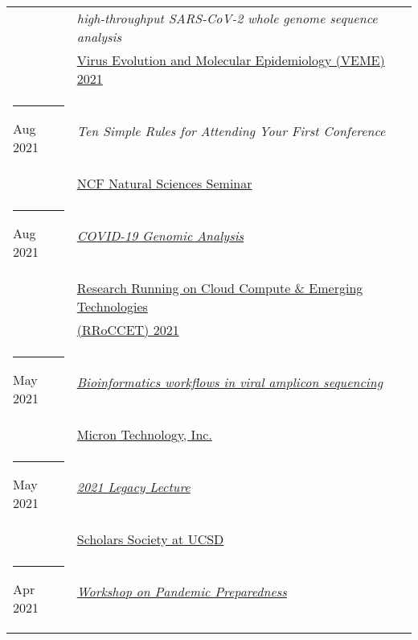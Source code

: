 \documentclass[margin,line]{res}
\begin{document}
\begin{resume}
\begin{longtable}{@{}p{0.7in}p{4in}}
\hspace*{-4mm} & \hspace{4mm} \textit{high-throughput SARS-CoV-2 whole genome sequence analysis}\\*
\hspace*{-4mm} & \hspace{4mm} \href{https://rega.kuleuven.be/cev/veme-workshop/2021}{Virus Evolution and Molecular Epidemiology (VEME) 2021}\\
\hspace*{-4mm} \rule{-1mm}{5mm} Aug 2021 & \textit{Ten Simple Rules for Attending Your First Conference}\\*
\hspace*{-4mm} & \hspace{4mm} \href{https://www.ncf.edu/academics/undergraduate-program/division-of-natural-sciences/natural-sciences/}{NCF Natural Sciences Seminar}\\
\hspace*{-4mm} \rule{-1mm}{5mm} Aug 2021 & \href{https://na.eventscloud.com/website/23042/}{\textit{COVID-19 Genomic Analysis}}\\*
\hspace*{-4mm} & \hspace{4mm} \href{https://na.eventscloud.com/website/23042/}{Research Running on Cloud Compute \& Emerging Technologies}\\*
\hspace*{-4mm} & \hspace{4mm} \href{https://na.eventscloud.com/website/23042/}{(RRoCCET) 2021}\\
\hspace*{-4mm} \rule{-1mm}{5mm} May 2021 & \href{https://www.micron.com/}{\textit{Bioinformatics workflows in viral amplicon sequencing}}\\*
\hspace*{-4mm} & \hspace{4mm} \href{https://www.micron.com/}{Micron Technology, Inc.}\\
\hspace*{-4mm} \rule{-1mm}{5mm} May 2021 & \href{https://studentorg.ucsd.edu/Home/Details/12340}{\textit{2021 Legacy Lecture}}\\*
\hspace*{-4mm} & \hspace{4mm} \href{https://studentorg.ucsd.edu/Home/Details/12340}{Scholars Society at UCSD}\\
\hspace*{-4mm} \rule{-1mm}{5mm} Apr 2021 & \href{https://www.ucop.edu/research-initiatives/programs/lab-fees/workshops.html}{\textit{Workshop on Pandemic Preparedness}}\\*

\end{longtable}
\end{resume}
\end{document}
